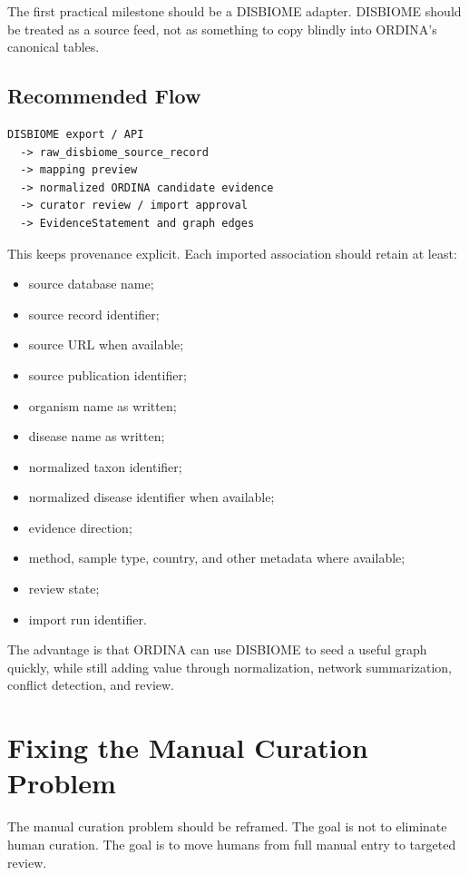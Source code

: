 \documentclass[11pt,a4paper]{article}
\begin{document}
The first practical milestone should be a DISBIOME adapter. DISBIOME should be treated as a source feed, not as something to copy blindly into ORDINA's canonical tables.

\subsection{Recommended Flow}

\begin{verbatim}
DISBIOME export / API
  -> raw_disbiome_source_record
  -> mapping preview
  -> normalized ORDINA candidate evidence
  -> curator review / import approval
  -> EvidenceStatement and graph edges
\end{verbatim}

This keeps provenance explicit. Each imported association should retain at least:

\begin{itemize}[noitemsep]
    \item source database name;
    \item source record identifier;
    \item source URL when available;
    \item source publication identifier;
    \item organism name as written;
    \item disease name as written;
    \item normalized taxon identifier;
    \item normalized disease identifier when available;
    \item evidence direction;
    \item method, sample type, country, and other metadata where available;
    \item review state;
    \item import run identifier.
\end{itemize}

The advantage is that ORDINA can use DISBIOME to seed a useful graph quickly, while still adding value through normalization, network summarization, conflict detection, and review.

\section{Fixing the Manual Curation Problem}

The manual curation problem should be reframed. The goal is not to eliminate human curation. The goal is to move humans from full manual entry to targeted review.
\end{document}
